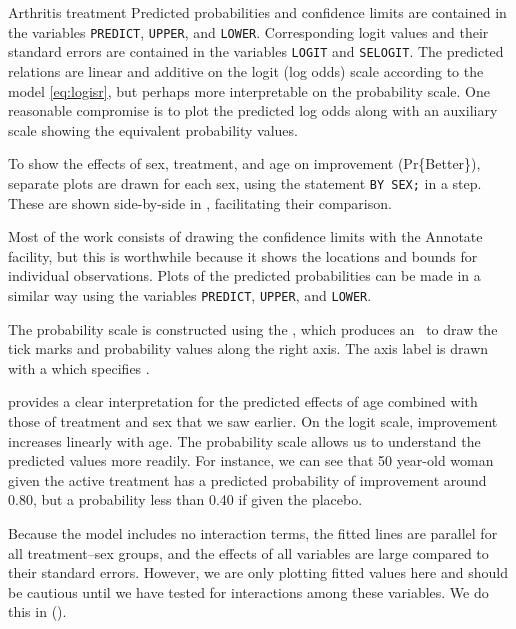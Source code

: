 \begin{Example}[arthrit10]{Arthritis treatment}
Predicted probabilities and confidence limits are contained in the
variables \texttt{PREDICT}, \texttt{UPPER}, and \texttt{LOWER}.
Corresponding logit values and their standard errors
are contained in the variables \texttt{LOGIT} and \texttt{SELOGIT}.
The predicted relations are linear and additive on the logit 
(log odds) scale
according to the model \eqref{eq:logisr},
but perhaps more interpretable on the probability scale.
One reasonable compromise is to plot the predicted log odds
along with an auxiliary scale showing the equivalent probability
values.

To show the
effects of sex, treatment, and age 
on improvement (Pr\{Better\}), 
separate plots
are drawn for each sex, using the statement \texttt{BY SEX;} in a 
 step.
These are shown side-by-side in ,
facilitating their comparison.


Most of the work consists of drawing the confidence
limits with the Annotate facility, but this is worthwhile because it shows
the locations and bounds for individual observations.  
Plots of the predicted probabilities can
be made in a similar way using the variables
\texttt{PREDICT}, \texttt{UPPER}, and \texttt{LOWER}.


The probability scale is constructed using the ,
which produces an \ADS\ to draw the tick marks and probability
values along the right axis.  The axis label is drawn with a
 which specifies .


 provides a clear interpretation for the
predicted effects of age combined with those of treatment and
sex that we saw earlier.  On the logit scale, improvement increases
linearly with age.  The probability scale allows us to understand
the predicted values more readily.   For instance, we can see that
50 year-old woman given the active treatment
has a predicted probability of improvement
around 0.80, but a probability less than 0.40 if given the placebo.

Because the model includes no interaction terms, the fitted lines
are parallel for all treatment--sex groups, and the effects of all
variables are large compared to their standard errors.
However, we are only plotting fitted values here and should be
cautious until we have tested for interactions among these variables.
We do this in  ().
\end{Example}


